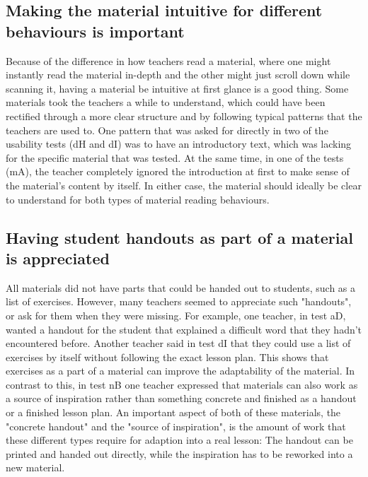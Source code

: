 \subsection{Making the material intuitive for different behaviours is important}
Because of the difference in how teachers read a material, where one might instantly read the material in-depth and the other might just scroll down while scanning it, having a material be intuitive at first glance is a good thing. Some materials took the teachers a while to understand, which could have been rectified through a more clear structure and by following typical patterns that the teachers are used to. One pattern that was asked for directly in two of the usability tests (dH and dI) was to have an introductory text, which was lacking for the specific material that was tested. At the same time, in one of the tests (mA), the teacher completely ignored the introduction at first to make sense of the material's content by itself. In either case, the material should ideally be clear to understand for both types of material reading behaviours.

\subsection{Having student handouts as part of a material is appreciated} \label{handouts}
All materials did not have parts that could be handed out to students, such as a list of exercises. However, many teachers seemed to appreciate such "handouts", or ask for them when they were missing. For example, one teacher, in test aD, wanted a handout for the student that explained a difficult word that they hadn't encountered before. Another teacher said in test dI that they could use a list of exercises by itself without following the exact lesson plan. This shows that exercises as a part of a material can improve the adaptability of the material. In contrast to this, in test nB one teacher expressed that materials can also work as a source of inspiration rather than something concrete and finished as a handout or a finished lesson plan. An important aspect of both of these materials, the "concrete handout" and the "source of inspiration", is the amount of work that these different types require for adaption into a real lesson: The handout can be printed and handed out directly, while the inspiration has to be reworked into a new material.

